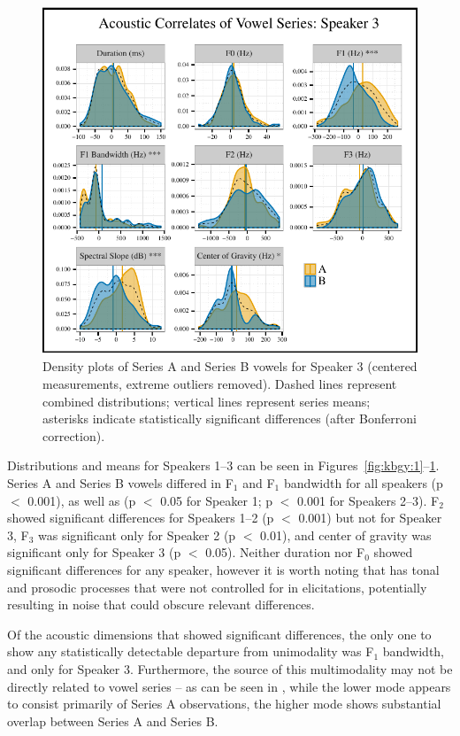 \documentclass[output=paper,newtxmath,modfonts,nonflat,hidelinks]{langsci/langscibook}
\begin{document}
\begin{figure}[p]
\includegraphics[height=.35\textheight]{figures/s3-correlates.pdf}
\caption{Density plots of Series A and Series B vowels for Speaker 3 (centered measurements, extreme outliers removed).  Dashed lines represent combined distributions; vertical lines represent series means; asterisks indicate statistically significant differences (after Bonferroni correction).}
\label{fig:kbgy:3}
\end{figure}

Distributions and means for Speakers 1--3 can be seen in Figures~\ref{fig:kbgy:1}--\ref{fig:kbgy:3}.  Series A and Series B vowels differed in F$_1$ and F$_1$ bandwidth for all speakers (p $<$ 0.001), as well as  (p $<$ 0.05 for Speaker 1; p $<$ 0.001 for Speakers 2--3). F$_2$ showed significant differences for Speakers 1--2 (p $<$ 0.001) but not for Speaker 3, F$_3$ was significant only for Speaker 2 (p $<$ 0.01), and center of gravity was significant only for Speaker 3 (p $<$ 0.05).  Neither duration nor F$_0$ showed significant differences for any speaker, however it is worth noting that  has tonal and prosodic processes \citep{Greenetal2015} that were not controlled for in elicitations, potentially resulting in noise that could obscure relevant differences.

Of the acoustic dimensions that showed significant differences, the only one to show any statistically detectable departure from unimodality was F$_1$ bandwidth, and only for Speaker 3.  Furthermore, the source of this multimodality may not be directly related to vowel series -- as can be seen in , while the lower mode appears to consist primarily of Series A observations, the higher mode shows substantial overlap between Series A and Series B.
\end{document}
